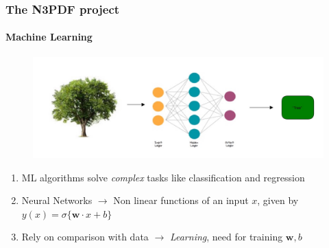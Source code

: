 \documentclass[aspectratio=43]{beamer}
\begin{document}
\begin{frame}

	\frametitle{The N3PDF project}
	\framesubtitle{Machine Learning}
	
	\begin{figure}[!htb]
	\includegraphics[width = \linewidth]{NNcomplete.jpg}
	\end{figure}
	
	\begin{enumerate}
	\item ML algorithms solve \textit{complex} tasks like classification and regression
	\item Neural Networks $\longrightarrow$ Non linear functions of an input $x$, given by $y(x) = \sigma \{ \textbf{w} \cdot x + b \}$
	\item Rely on comparison with data $\longrightarrow$ \textit{Learning}, need for training $\textbf{w}, b$
	\end{enumerate}

\end{frame}
\end{document}
